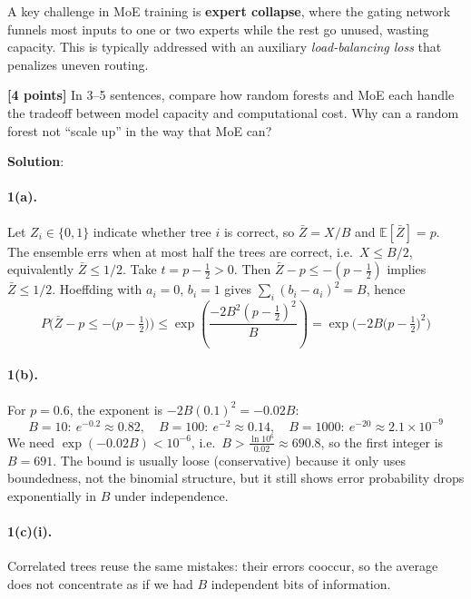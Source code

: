 \documentclass[submit]{../harvardml}
\newcommand{\E}{\mathbb{E}}
\newenvironment{solution}{
    \vspace{2mm}
    \color{blue}\noindent\textbf{Solution}:
}{}
\begin{document}
\begin{problem}
\begin{enumerate}
A key challenge in MoE training is \textbf{expert collapse}, where the gating network funnels most inputs to one or two experts while the rest go unused, wasting capacity. This is typically addressed with an auxiliary \emph{load-balancing loss} that penalizes uneven routing.

\textbf{[4 points]} In 3--5 sentences, compare how random forests and MoE each handle the tradeoff between model capacity and computational cost. Why can a random forest not ``scale up'' in the way that MoE can?
\end{enumerate}

\end{problem}

\newpage

\begin{solution}

\paragraph{1(a).}
Let $Z_i \in \{0,1\}$ indicate whether tree $i$ is correct, so $\bar{Z} = X/B$ and $\E[\bar{Z}] = p$. The ensemble errs when at most half the trees are correct, i.e.\ $X \le B/2$, equivalently $\bar{Z} \le 1/2$. Take $t = p - \tfrac{1}{2} > 0$. Then $\bar{Z} - p \le -(p - \tfrac{1}{2})$ implies $\bar{Z} \le 1/2$. Hoeffding with $a_i = 0$, $b_i = 1$ gives $\sum_i (b_i - a_i)^2 = B$, hence
\[
  P\!\Big(\bar{Z} - p \le -\Big(p - \tfrac{1}{2}\Big)\Big)
  \le \exp\!\left(\frac{-2B^2 (p - \tfrac{1}{2})^2}{B}\right)
  = \exp\!\Big({-2B\big(p - \tfrac{1}{2}\big)^2}\Big)
\]

\paragraph{1(b).}
For $p = 0.6$, the exponent is $-2B(0.1)^2 = -0.02B$:
\[
  B = 10:\ e^{-0.2} \approx 0.82, \quad
  B = 100:\ e^{-2} \approx 0.14, \quad
  B = 1000:\ e^{-20} \approx 2.1 \times 10^{-9}
\]
We need $\exp(-0.02B) < 10^{-6}$, i.e.\ $B > \frac{\ln 10^6}{0.02} \approx 690.8$, so the first integer is $B = 691$. The bound is usually loose (conservative) because it only uses boundedness, not the binomial structure, but it still shows error probability drops exponentially in $B$ under independence.

\paragraph{1(c)(i).}
Correlated trees reuse the same mistakes: their errors cooccur, so the average does not concentrate as if we had $B$ independent bits of information.


\end{solution}
\end{document}
